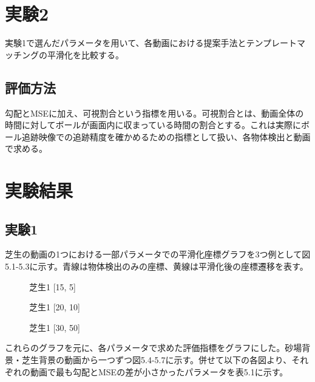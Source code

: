 \documentclass[11pt,a4j]{jreport}
\begin{document}
\section{実験2}
実験1で選んだパラメータを用いて、各動画における提案手法とテンプレートマッチングの平滑化を比較する。

\subsection{評価方法}
勾配とMSEに加え、可視割合という指標を用いる。可視割合とは、動画全体の時間に対してボールが画面内に収まっている時間の割合とする。これは実際にボール追跡映像での追跡精度を確かめるための指標として扱い、各物体検出と動画で求める。

\section{実験結果}
\subsection{実験1}
芝生の動画の1つにおける一部パラメータでの平滑化座標グラフを3つ例として図5.1-5.3に示す。青線は物体検出のみの座標、黄線は平滑化後の座標遷移を表す。

\begin{figure}[H]
    \centering
    \caption{芝生1 [15, 5]}
    \label{fig:ラベル}
\end{figure}

\begin{figure}[H]
    \centering
    \caption{芝生1 [20, 10]}
    \label{fig:ラベル}
\end{figure}

\begin{figure}[H]
    \centering
    \caption{芝生1 [30, 50]}
    \label{fig:ラベル}
\end{figure}

\vspace{\baselineskip}

これらのグラフを元に、各パラメータで求めた評価指標をグラフにした。砂場背景・芝生背景の動画から一つずつ図5.4-5.7に示す。併せて以下の各図より、それぞれの動画で最も勾配とMSEの差が小さかったパラメータを表5.1に示す。
\end{document}
